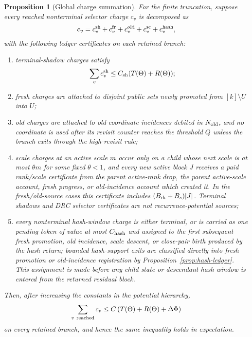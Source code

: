 \documentclass[11pt]{article}
\newtheorem{proposition}[theorem]{Proposition}
\begin{document}
\begin{proposition}[Global charge summation]
\label{prop:global-charge}
For the finite truncation, suppose every reached nonterminal selector charge
$c_v$ is decomposed as
\[
  c_v=c_v^{\rm sh}+c_v^{\rm fr}+c_v^{\rm old}
      +c_v^{\rm sc}+c_v^{\rm hash},
\]
with the following ledger certificates on each retained branch:
\begin{enumerate}[label=\textup{(\roman*)}]
\item terminal-shadow charges satisfy
  \[
    \sum_v c_v^{\rm sh}\le C_{\rm sh}(T(\Theta)+R(\Theta));
  \]
\item fresh charges are attached to disjoint public sets newly promoted from
  $[k]\setminus U$ into $U$;
\item old charges are attached to old-coordinate incidences debited in
  $N_{\rm old}$, and no coordinate is used after its revisit counter reaches
  the threshold $Q$ unless the branch exits through the high-revisit rule;
\item scale charges at an active scale $m$ occur only on a child whose next
  scale is at most $\theta m$ for some fixed $\theta<1$, and every new active
  block $J$ receives a paid rank/scale certificate from the parent active-rank
  drop, the parent active-scale account, fresh progress, or old-incidence
  account which created it.  In the fresh/old-source cases this certificate
  includes $(B_{\rm rk}+B_s)|J|$.  Terminal shadows and DRC selector
  certificates are not recurrence-potential sources;
\item every nonterminal hash-window charge is either terminal, or is carried
as one pending token of value at most $C_{\rm hash}$ and assigned to the first
subsequent fresh promotion, old incidence, scale descent, or close-pair birth
produced by the hash return; bounded hash-support exits are classified
directly into fresh promotion or old-incidence registration by
Proposition~\ref{prop:hash-ledger}.  This assignment is made before any child
state or descendant hash window is entered from the returned residual block.
\end{enumerate}
Then, after increasing the constants in the potential hierarchy,
\[
  \sum_{v\ {\rm reached}} c_v
  \le
  C\,(T(\Theta)+R(\Theta)+\Delta\Phi)
\]
on every retained branch, and hence the same inequality holds in expectation.
\end{proposition}
\end{document}

